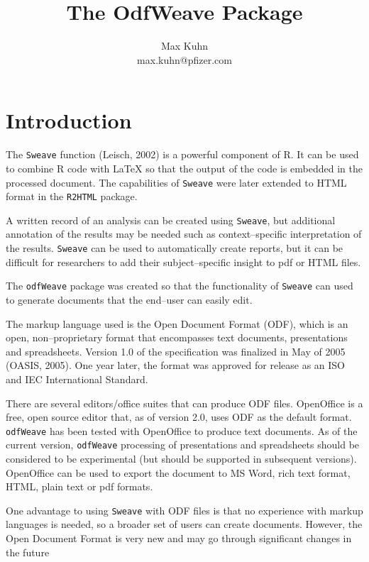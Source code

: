 \documentclass[12pt]{article}
\title{The OdfWeave Package}
\author{Max Kuhn \\ max.kuhn@pfizer.com}
\newcommand{\odfWeave}{{\tt odfWeave}\xspace}
\begin{document}
\maketitle

\thispagestyle{empty}
	
\section{Introduction}


The \texttt{Sweave} function (Leisch, 2002) is a powerful component of R. It can be used to combine R code with \LaTeX{} so that the output of the code is embedded in the processed document. The capabilities of \texttt{Sweave} were later extended to HTML format in the \texttt{R2HTML} package.

A written record of an analysis can be created using \texttt{Sweave}, but additional annotation of the results may be needed such as context--specific interpretation of the results. \texttt{Sweave} can be used to automatically create reports, but it can be difficult for researchers to add their subject--specific insight to pdf or HTML files.

The \odfWeave package was created so that the functionality of \texttt{Sweave} can used to generate documents that the end--user can easily edit. 

The markup language used is the Open Document Format (ODF), which is an open, non--proprietary format that encompasses text documents, presentations and spreadsheets. Version 1.0 of the specification was finalized in May of 2005 (OASIS, 2005). One year later, the format was approved for release as an ISO and IEC International Standard. 

There are several editors/office suites that can produce ODF files. OpenOffice is a free, open source editor that, as of version 2.0, uses ODF as the default format. \odfWeave has been tested with OpenOffice to produce text documents. As of the current version, \odfWeave processing of presentations and spreadsheets should be considered to be experimental (but should be supported in subsequent versions). OpenOffice can be used to export the document to MS Word, rich text format, HTML, plain text or pdf formats.

One advantage to using \texttt{Sweave} with ODF files is that no experience with markup languages is needed, so a broader set of users can create documents. However, the Open Document Format is very new and may go through significant changes in the future 
\end{document}
